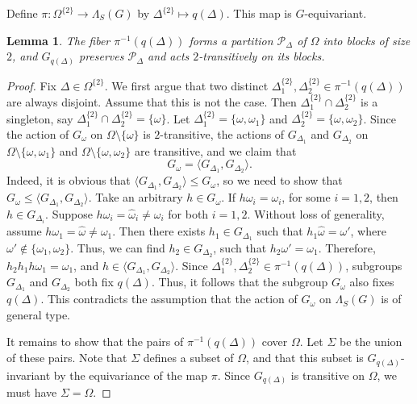 \documentclass[11pt,letterpaper]{article}
\newtheorem{lem}[thm]{Lemma}
\theoremstyle{definition}
\theoremstyle{remark}
\begin{document}
 Define $\pi \colon \Omega^{\{2\}} \longrightarrow \Lambda_S(G)$ by $\Delta^{\{2\}} \mapsto q(\Delta)$. This map is $G$-equivariant.

\begin{lem}\label{2-transitive action preserves blocks}
    The fiber $\pi^{-1}(q(\Delta))$ forms a partition $\mathcal{P}_\Delta$ of $\Omega$ into blocks of size $2$, and $G_{q(\Delta)}$ preserves $\mathcal{P}_\Delta$ and acts $2$-transitively on its blocks.
\end{lem}
\begin{proof} 
    Fix $\Delta \in \Omega^{\{2\}}$. We first argue that two distinct $\Delta_1^{\{2\}}, \Delta_2^{\{2\}} \in \pi^{-1}(q(\Delta))$ are always disjoint. Assume that this is not the case. Then $\Delta_1^{\{2\}} \cap \Delta_2^{\{2\}}$ is a singleton, say $\Delta_1^{\{2\}} \cap \Delta_2^{\{2\}}=\{\omega\}$.  Let $\Delta_1^{\{2\}}=\{\omega, \omega_1\}$ and $\Delta_2^{\{2\}}= \{\omega, \omega_2\}$. Since the action of $G_\omega$ on $\Omega \setminus \{\omega\}$ is $2$-transitive, the actions of $G_{\Delta_1}$ and $G_{\Delta_2}$ on $\Omega \setminus \{\omega, \omega_1\}$ and $\Omega \setminus \{\omega, \omega_2\}$ are transitive, and we claim that 
    $$
    G_\omega = \langle G_{\Delta_1}, G_{\Delta_2}\rangle.
    $$
 Indeed, it is obvious that $\langle G_{\Delta_1}, G_{\Delta_2}\rangle \leq G_\omega$, so we need to show that 
    $G_\omega \leq \langle G_{\Delta_1}, G_{\Delta_2}\rangle$.
    Take an arbitrary $h \in G_\omega$. If $h\omega_i=\omega_i$, for some $i=1,2$, then $h \in G_{\Delta_i}$. Suppose $h\omega_i=\widehat{\omega}_i \neq \omega_i$ for both $i=1,2$. Without loss of generality, assume $h\omega_1= \widehat{\omega} \neq \omega_1$. Then there exists $h_1 \in G_{\Delta_1}$ such that $h_1\widehat{\omega}=\omega'$, where $\omega' \notin \{\omega_1, \omega_2\}$. Thus, we can find $h_2 \in G_{\Delta_2}$, such that $h_2\omega' =\omega_1$. Therefore, $h_2h_1h\omega_1=\omega_1$, and $h \in \langle G_{\Delta_1}, G_{\Delta_2}\rangle$. Since $\Delta_1^{\{2\}}, \Delta_2^{\{2\}} \in \pi^{-1}(q(\Delta))$, subgroups $G_{\Delta_1}$ and $G_{\Delta_2}$ both fix $q(\Delta)$. Thus, it follows that the subgroup $G_\omega$ also fixes $q(\Delta)$. This contradicts the assumption that the action of $G_\omega$ on $\Lambda_S(G)$ is of general type.

    It remains to show that the pairs of $\pi^{-1}(q(\Delta))$ cover $\Omega$. Let $\Sigma$ be the union of these pairs. Note that $\Sigma$ defines a subset of $\Omega$, and that this subset is $G_{q(\Delta)}$-invariant by the equivariance of the map $\pi$. Since $G_{q(\Delta)}$ is transitive on $\Omega$, we must have $\Sigma=\Omega$.


\end{proof}
\end{document}
